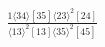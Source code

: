 \documentclass[varwidth, border=5pt]{standalone}
\begin{document}
\begin{my}
$\begin{gathered}
\scriptscriptstyle\frac{1⟨34⟩[35]⟨23⟩^2[24]}{⟨13⟩^2[13]⟨35⟩^2[45]}
\end{gathered}$
\end{my}
\end{document}
